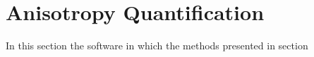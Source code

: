 \section{Anisotropy Quantification}
\label{sec:anisotropy_code}

In this section the software in which the methods presented in section
